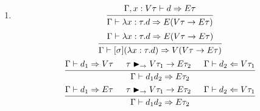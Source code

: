 \documentclass{article}
\newcommand{\entails}{\mathrel{\mathop{\vdash}}}
\newcommand{\synth}{\mathrel{\mathop{\Rightarrow}}}
\newcommand{\analyze}{\mathrel{\mathop{\Leftarrow}}}
\newcommand{\MatchArrow}{\mathrel{\mathop{\blacktriangleright_{\rightarrow}}}}
\begin{document}
\begin{enumerate}
  \item
    \[
      \begin{prooftree}
        \hypo{\Gamma, x : V \tau \entails d \synth E \tau}
        \infer1[]{\Gamma \entails \lambda x : \tau . d \synth E (V \tau \to E \tau)}
      \end{prooftree}
    \]
    \[
      \begin{prooftree}
        \hypo{
          \Gamma \entails
          \lambda x : \tau . d
          \synth E (V \tau \to E \tau)
        }
        \infer1[]{
          \Gamma \entails [\sigma] (\lambda x : \tau . d)
          \synth
          V (V \tau \to E \tau)
        }
      \end{prooftree}
    \]
    \[
      \begin{prooftree}
        \hypo{\Gamma \entails d_1 \synth V \tau}
        \hypo{\tau \MatchArrow V \tau_1 \to E \tau_2}
        \hypo{\Gamma \entails d_2 \analyze V \tau_1}
        \infer3[]{\Gamma \entails d_1 d_2 \synth E \tau_2}
      \end{prooftree}
    \]
    \[
      \begin{prooftree}
        \hypo{\Gamma \entails d_1 \synth E \tau}
        \hypo{\tau \MatchArrow V \tau_1 \to E \tau_2}
        \hypo{\Gamma \entails d_2 \analyze V \tau_1}
        \infer3[]{\Gamma \entails d_1 d_2 \synth E \tau_2}
      \end{prooftree}
    \]
\end{enumerate}
\end{document}
